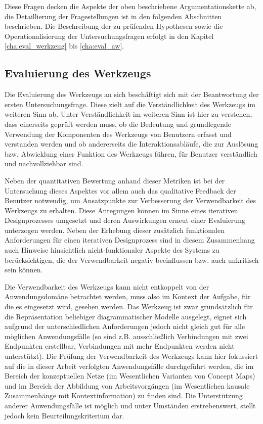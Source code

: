 Diese Fragen decken die Aspekte der oben beschriebene Argumentationskette ab, die Detaillierung der Fragestellungen ist in den folgenden Abschnitten beschrieben. Die Beschreibung der zu prüfenden Hypothesen sowie die Operationalisierung der Untersuchungsfragen erfolgt in den Kapitel \ref{cha:eval_werkzeug} bis \ref{cha:eval_aw}.

\subsection{Evaluierung des Werkzeugs}
\label{sub:eval_werkzeug}

Die Evaluierung des Werkzeugs an sich beschäftigt sich mit der Beantwortung der ersten Untersuchungsfrage. Diese zielt auf die Verständlichkeit des Werkzeugs im weiteren Sinn ab. Unter Verständlichkeit im weiteren Sinn ist hier zu verstehen, dass einerseits geprüft werden muss, ob die Bedeutung und grundlegende Verwendung der Komponenten des Werkzeugs von Benutzern erfasst und verstanden werden und ob andererseits die Interaktionsabläufe, die zur Auslösung bzw. Abwicklung einer Funktion des Werkzeugs führen, für Benutzer verständlich und nachvollziehbar sind.

Neben der quantitativen Bewertung anhand dieser Metriken ist bei der Untersuchung dieses Aspektes vor allem auch das qualitative Feedback der Benutzer notwendig, um Ansatzpunkte zur Verbesserung der Verwendbarkeit des Werkzeugs zu erhalten. Diese Anregungen können im Sinne eines iterativen Designprozesses umgesetzt und deren Auswirkungen erneut einer Evaluierung unterzogen werden. Neben der Erhebung dieser zusätzlich funktionalen Anforderungen für einen iterativen Designprozess sind in diesem Zusammenhang auch Hinweise hinsichtlich nicht-funktionaler Aspekte des Systems zu berücksichtigen, die der Verwendbarkeit negativ beeinflussen bzw. auch unkritisch sein können.

Die Verwendbarkeit des Werkzeugs kann nicht entkoppelt von der Anwendungsdomäne betrachtet werden, muss also im Kontext der Aufgabe, für die es eingesetzt wird, gesehen werden. Das Werkzeug ist zwar grundsätzlich für die Repräsentation beliebiger diagrammatischer Modelle ausgelegt, eignet sich aufgrund der unterschiedlichen Anforderungen jedoch nicht gleich gut für alle möglichen Anwendungsfälle (so sind z.B. ausschließlich Verbindungen mit zwei Endpunkten erstellbar, Verbindungen mit mehr Endpunkten werden nicht unterstützt). Die Prüfung der Verwendbarkeit des Werkzeugs kann hier fokussiert auf die in dieser Arbeit verfolgten Anwendungsfälle durchgeführt werden, die im Bereich der konzeptuellen Netze (im Wesentlichen Varianten von Concept Maps) und im Bereich der Abbildung von Arbeitsvorgängen (im Wesentlichen kausale Zusammenhänge mit Kontextinformation) zu finden sind. Die Unterstützung anderer Anwendungsfälle ist möglich und unter Umständen erstrebenswert, stellt jedoch kein Beurteilungskriterium dar.

